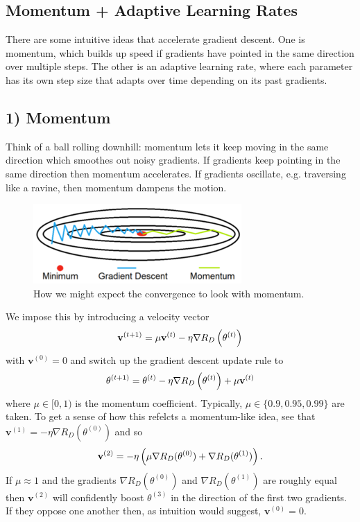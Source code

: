 \documentclass[11pt]{article}
\begin{document}
\subsection{Momentum + Adaptive Learning Rates}
There are some intuitive ideas that accelerate gradient descent. One is momentum, which builds up speed if gradients have pointed in the same direction over multiple steps. The other is an adaptive learning rate, where each parameter has its own step size that adapts over time depending on its past gradients.

\subsection*{1) Momentum}
Think of a ball rolling downhill: momentum lets it keep moving in the same direction which smoothes out noisy gradients. If gradients keep pointing in the same direction then momentum accelerates. If gradients oscillate, e.g. traversing like a ravine, then momentum dampens the motion.

\begin{figure}[t]
    \centering
    \includegraphics[width=\columnwidth]{./figures/gradient_descent/momentum.png}
    \caption{How we might expect the convergence to look with momentum. }
    \label{fig:gradient_descent_momentum}
\end{figure}

We impose this by introducing a velocity vector
$$
\mathbf{v}^{(t+1)}=\mu\mathbf{v}^{(t)}-\eta\nabla R_D\left(\theta^{(t)}\right)
$$
with $\mathbf{v}^{(0)}=0$ and switch up the gradient descent update rule to
$$
\theta^{(t+1)}
=
\theta^{(t)}-\eta\nabla R_D\left(\theta^{(t)}\right)+\mu\mathbf{v}^{(t)}
$$
where $\mu\in[0,1)$ is the momentum coefficient. Typically, $\mu\in\{0.9,0.95,0.99\}$ are taken. To get a sense of how this refelcts a momentum-like idea, see that $\mathbf{v}^{(1)}=-\eta\nabla R_D(\theta^{(0)})$ and so
$$
\mathbf{v}^{(2)}
=
-\eta\left(\mu\nabla R_D(\theta^{(0)})+\nabla R_D(\theta^{(1)})\right).
$$
If $\mu\approx1$ and the gradients $\nabla R_D(\theta^{(0)})$ and $\nabla R_D(\theta^{(1)})$ are roughly equal then $\mathbf{v}^{(2)}$ will confidently boost $\theta^{(3)}$ in the direction of the first two gradients. If they oppose one another then, as intuition would suggest, $\mathbf{v}^{(0)}=0$.
\end{document}
